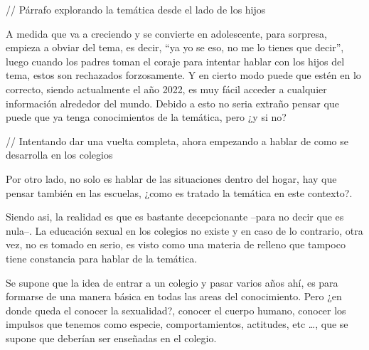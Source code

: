 \documentclass[letterpaper, 12pt]{report}
\begin{document}
    {\small // Párrafo explorando la temática desde el lado de los hijos}

A medida que va a creciendo y se convierte en adolescente,
para sorpresa, empieza a obviar del tema, es decir, ``ya yo
se eso, no me lo tienes que decir'', luego cuando los
padres toman el coraje para intentar hablar con los hijos
del tema, estos son rechazados forzosamente. Y en cierto
modo puede que estén en lo correcto, siendo actualmente el
año 2022, es muy fácil acceder a cualquier información
alrededor del mundo. Debido a esto no seria extraño pensar
que puede que ya tenga conocimientos de la temática, pero
¿y si no?

{\small // Intentando dar una vuelta completa, ahora empezando a hablar
de como se desarrolla en los colegios}

Por otro lado, no solo es hablar de las situaciones dentro
del hogar, hay que pensar también en las escuelas, ¿como es
tratado la temática en este contexto?.

Siendo asi, la realidad es que es bastante decepcionante
--para no decir que es nula--. La educación sexual en los
colegios no existe y en caso de lo contrario, otra vez, no
es tomado en serio, es visto como una materia de relleno
que tampoco tiene constancia para hablar de la temática.

Se supone que la idea de entrar a un colegio y pasar varios
años ahí, es para formarse de una manera básica en todas
las areas del conocimiento. Pero ¿en donde queda el conocer
la sexualidad?, conocer el cuerpo humano, conocer los impulsos que tenemos 
como especie, comportamientos, actitudes, etc \dots\@, que se supone
que deberían ser enseñadas en el colegio.

\newpage

\printbibliography
\end{document}
